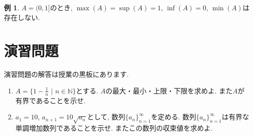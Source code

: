 \documentclass[dvipdfmx,a4paper,11pt]{article}
\newcommand{\N}{\mathbb{N}}
\theoremstyle{definition}
\newtheorem{exa}[thm]{例}
\begin{document}
   \begin{exa}
$A = (0,1]$のとき, $\max(A) =\sup(A)=1$, $\inf(A)=0$, $\min(A)$は存在しない.
\end{exa}

\section{演習問題}
演習問題の解答は授業の黒板にあります.
\begin{enumerate}
\item $A = \{ 1 - \frac{1}{n} \,\,| \,\, n \in \N\}$とする.
$A$の最大・最小・上限・下限を求めよ. また$A$が有界であることを示せ.
\item $a_1=10$, $a_{n+1} = 10 \sqrt{a_n}$として, 数列$\{ a_n \}_{n=1}^{\infty}$を定める. 
数列$\{ a_n \}_{n=1}^{\infty}$は有界な単調増加数列であることを示せ.
またこの数列の収束値を求めよ.
\end{enumerate}



 
\end{document}
